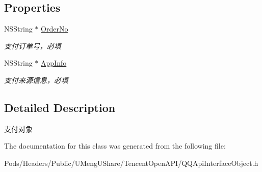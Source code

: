 \subsection*{Properties}
\begin{DoxyCompactItemize}
\item 
\mbox{\label{interface_q_q_api_pay_object_ab6a595525128412a42b240f4fa66ba40}} 
N\+S\+String $\ast$ \mbox{\hyperlink{interface_q_q_api_pay_object_ab6a595525128412a42b240f4fa66ba40}{Order\+No}}
\begin{DoxyCompactList}\small\item\em 支付订单号，必填 \end{DoxyCompactList}\item 
\mbox{\label{interface_q_q_api_pay_object_abbf016be15e2e1aac0253db9502f4009}} 
N\+S\+String $\ast$ \mbox{\hyperlink{interface_q_q_api_pay_object_abbf016be15e2e1aac0253db9502f4009}{App\+Info}}
\begin{DoxyCompactList}\small\item\em 支付来源信息，必填 \end{DoxyCompactList}\end{DoxyCompactItemize}


\subsection{Detailed Description}
支付对象 

The documentation for this class was generated from the following file\+:\begin{DoxyCompactItemize}
\item 
Pods/\+Headers/\+Public/\+U\+Meng\+U\+Share/\+Tencent\+Open\+A\+P\+I/Q\+Q\+Api\+Interface\+Object.\+h\end{DoxyCompactItemize}
